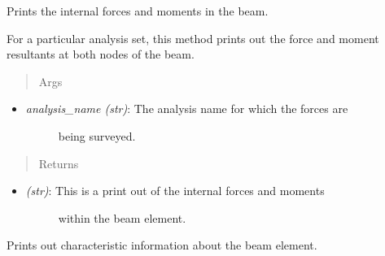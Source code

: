 \documentclass[letterpaper,10pt,english]{sphinxmanual}
\begin{document}
\begin{fulllineitems}
\begin{fulllineitems}
\begin{itemize}
\end{itemize}

\end{fulllineitems}


\begin{fulllineitems}
\label{structures:AeroComBAT.Structures.TBeam.printInternalForce}
Prints the internal forces and moments in the beam.

For a particular analysis set, this method prints out the force and
moment resultants at both nodes of the beam.
\begin{quote}\begin{description}
\item[{Args}] \leavevmode
\end{description}\end{quote}
\begin{itemize}
\item {} \begin{description}
\item[{\emph{analysis\_name (str)}: The analysis name for which the forces are}] \leavevmode
being surveyed.

\end{description}

\end{itemize}
\begin{quote}\begin{description}
\item[{Returns}] \leavevmode
\end{description}\end{quote}
\begin{itemize}
\item {} \begin{description}
\item[{\emph{(str)}: This is a print out of the internal forces and moments}] \leavevmode
within the beam element.

\end{description}

\end{itemize}

\end{fulllineitems}


\begin{fulllineitems}
\label{structures:AeroComBAT.Structures.TBeam.printSummary}
Prints out characteristic information about the beam element.


\end{fulllineitems}
\end{fulllineitems}
\end{document}
